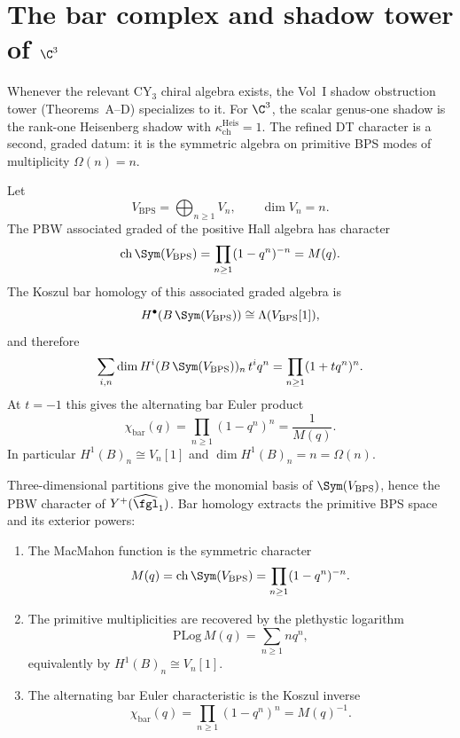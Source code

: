 \section{The bar complex and shadow tower of \texorpdfstring{$\C^3$}{C-3}}
\label{sec:c3-bar-shadow}

Whenever the relevant CY$_3$ chiral algebra exists, the Vol~I shadow obstruction tower (Theorems~A--D) specializes to it. For $\C^3$, the scalar genus-one shadow is the rank-one Heisenberg shadow with $\kappa_{\mathrm{ch}}^{\mathrm{Heis}} = 1$. The refined DT character is a second, graded datum: it is the symmetric algebra on primitive BPS modes of multiplicity $\Omega(n)=n$.


\begin{proposition}
\label{prop:c3-bar-euler}
Let
\[
 V_{\mathrm{BPS}}=\bigoplus_{n\geq 1} V_n,
 \qquad \dim V_n=n .
\]
The PBW associated graded of the positive Hall algebra has character
\[
 \mathrm{ch}\,\Sym(V_{\mathrm{BPS}})
 =\prod_{n\geq 1}(1-q^n)^{-n}
 = M(q).
\]
The Koszul bar homology of this associated graded algebra is
\[
 H^\bullet(B\,\Sym(V_{\mathrm{BPS}}))
 \cong \Lambda(V_{\mathrm{BPS}}[1]),
\]
and therefore
\[
 \sum_{i,n}\dim H^i(B\,\Sym(V_{\mathrm{BPS}}))_n\,t^i q^n
 =\prod_{n\geq 1}(1+tq^n)^n.
\]
At $t=-1$ this gives the alternating bar Euler product
\[
 \chi_{\mathrm{bar}}(q)
 =\prod_{n\geq 1}(1-q^n)^n
 =\frac{1}{M(q)}.
\]
In particular $H^1(B)_n\cong V_n[1]$ and $\dim H^1(B)_n=n=\Omega(n)$.
\end{proposition}


\begin{proposition}
\label{prop:crystal-melting-bar-cohomology}
Three-dimensional partitions give the monomial basis of
\(\Sym(V_{\mathrm{BPS}})\), hence the PBW character of
\(Y^+(\widehat{\fgl}_1)\). Bar homology extracts the primitive BPS
space and its exterior powers:
\begin{enumerate}[label=\textup{(\roman*)}]
 \item The MacMahon function is the symmetric character
 \[
  M(q)=\mathrm{ch}\,\Sym(V_{\mathrm{BPS}})
  =\prod_{n\geq 1}(1-q^n)^{-n}.
 \]
 \item The primitive multiplicities are recovered by the plethystic
 logarithm
 \[
  \mathrm{PLog}\,M(q)=\sum_{n\geq 1} n q^n,
 \]
 equivalently by \(H^1(B)_n\cong V_n[1]\).
 \item The alternating bar Euler characteristic is the Koszul inverse
 \[
  \chi_{\mathrm{bar}}(q)=\prod_{n\geq 1}(1-q^n)^n=M(q)^{-1}.
 \]
\end{enumerate}
\end{proposition}

